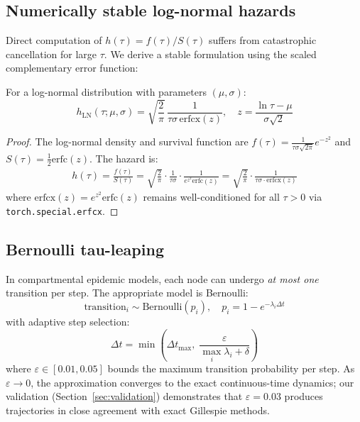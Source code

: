 \subsection{Numerically stable log-normal hazards}

Direct computation of $h(\tau) = f(\tau)/S(\tau)$ suffers from catastrophic cancellation for large $\tau$. We derive a stable formulation using the scaled complementary error function:

\begin{proposition}
For a log-normal distribution with parameters $(\mu, \sigma)$:
\begin{equation}\label{eq:stable_hazard}
h_{\mathrm{LN}}(\tau; \mu, \sigma) = \sqrt{\frac{2}{\pi}} \,\frac{1}{\tau \sigma \,\mathrm{erfcx}(z)}, \quad z = \frac{\ln \tau - \mu}{\sigma\sqrt{2}}
\end{equation}
\end{proposition}

\begin{proof}
The log-normal density and survival function are $f(\tau) = \frac{1}{\tau \sigma \sqrt{2\pi}} e^{-z^2}$ and $S(\tau) = \frac{1}{2} \mathrm{erfc}(z)$. The hazard is:
\begin{align}
    h(\tau) = \frac{f(\tau)}{S(\tau)} = \sqrt{\frac{2}{\pi}} \cdot \frac{1}{\tau \sigma} \cdot \frac{1}{e^{z^2} \mathrm{erfc}(z)} = \sqrt{\frac{2}{\pi}} \cdot \frac{1}{\tau \sigma \cdot \mathrm{erfcx}(z)}
\end{align}
where $\mathrm{erfcx}(z) = e^{z^2} \mathrm{erfc}(z)$ remains well-conditioned for all $\tau > 0$ via \texttt{torch.special.erfcx}.
\end{proof}

\subsection{Bernoulli tau-leaping}

In compartmental epidemic models, each node can undergo \emph{at most one} transition per step. The appropriate model is Bernoulli:
\begin{equation}
    \text{transition}_i \sim \text{Bernoulli}(p_i), \quad p_i = 1 - e^{-\lambda_i \Delta t}
\end{equation}
with adaptive step selection:
\begin{equation}
    \Delta t = \min\left(\Delta t_{\max},\; \frac{\varepsilon}{\max_i \lambda_i + \delta}\right)
\end{equation}
where $\varepsilon \in [0.01, 0.05]$ bounds the maximum transition probability per step. As $\varepsilon \to 0$, the approximation converges to the exact continuous-time dynamics; our validation (Section~\ref{sec:validation}) demonstrates that $\varepsilon = 0.03$ produces trajectories in close agreement with exact Gillespie methods.

